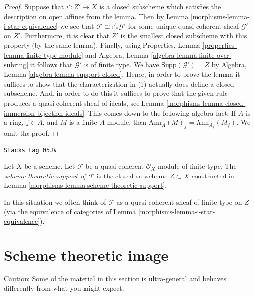 \begin{proof}

Suppose that $i' : Z' \to X$ is a closed subscheme which satisfies the
description on open affines from the lemma. Then by
Lemma \ref{morphisms-lemma-i-star-equivalence}
we see that $\mathcal{F} \cong i'_*\mathcal{G}'$ for some unique
quasi-coherent sheaf $\mathcal{G}'$ on $Z'$. Furthermore, it is clear
that $Z'$ is the smallest closed subscheme with this property (by the
same lemma). Finally, using
Properties, Lemma \ref{properties-lemma-finite-type-module}
and
Algebra, Lemma \ref{algebra-lemma-finite-over-subring}
it follows that $\mathcal{G}'$ is of finite type. We have
$\text{Supp}(\mathcal{G}') = Z$ by
Algebra, Lemma \ref{algebra-lemma-support-closed}.
Hence, in order to prove the lemma it suffices to show that
the characterization in (1) actually does define a closed subscheme.
And, in order to do this it suffices to prove that the given rule
produces a quasi-coherent sheaf of ideals, see
Lemma \ref{morphisms-lemma-closed-immersion-bijection-ideals}.
This comes down to the following algebra fact: If $A$ is a ring, $f \in A$,
and $M$ is a finite $A$-module, then
$\text{Ann}_A(M)_f = \text{Ann}_{A_f}(M_f)$.
We omit the proof.
\end{proof}

\begin{definition}
\label{morphisms-definition-scheme-theoretic-support}
\href{https://stacks.math.columbia.edu/tag/05JV}{\texttt{Stacks tag 05JV}}

Let $X$ be a scheme. Let $\mathcal{F}$ be a quasi-coherent
$\mathcal{O}_X$-module of finite type. The {\it scheme theoretic support
of $\mathcal{F}$} is the closed subscheme $Z \subset X$ constructed in
Lemma \ref{morphisms-lemma-scheme-theoretic-support}.
\end{definition}

In this situation we often think of $\mathcal{F}$ as a quasi-coherent
sheaf of finite type on $Z$ (via the equivalence of categories of
Lemma \ref{morphisms-lemma-i-star-equivalence}).

\section{Scheme theoretic image}
\label{morphisms-section-scheme-theoretic-image}
Caution: Some of the material in this section is ultra-general and
behaves differently from what you might expect.

